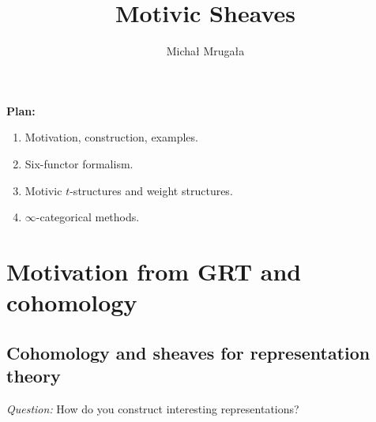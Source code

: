 

\usepackage{stmaryrd}
\usepackage[nameinlink]{cleveref}

\newcommand{\SC}{\mathcal{C}}
\newcommand{\OO}{\mathcal{O}}
\def\coker{\operatorname{coker}}
\def\bL{\mathbf{L}}
\def\CT{\mathcal{T}}
\def\Aut{\operatorname{Aut}}
\def\wt{\widetilde}
\def\ko{\mathfrak{o}}
\def\kt{\mathfrak{t}}
\newcommand{\CX}{\mathcal{X}}
\def\coker{\operatorname{coker}}
\def\bL{\mathbf{L}}
\def\wh{\widehat}
\def\CI{\mathcal{I}}
\def\et{^\text{\'et}}
\def\sep{^\text{sep}}
\def\pr{\operatorname{pr}}
\def\img{\operatorname{im}}
\def\Sym{\operatorname{Sym}}
\def\CG{\mathcal{G}}
\def\N{\mathbb{N}}
\def\th{^{\mathrm{th}}}
\def\CN{\mathcal{N}}
\def\Inf{\operatorname{Inf}}
\def\rank{\operatorname{rank}}
\def\Pic{\operatorname{Pic}}
\def\i{\operatorname{inv}}
\def\Diag{\operatorname{Diag}}
\def\G{\mathbb{G}}
\def\End{\operatorname{End}}
\def\det{\operatorname{det}}
\def\SL{\bb{SL}}
\def\Rep{\operatorname{Rep}}
\def\Repf{\operatorname{Rep}^{\text{fd}}}
\def\Res{\operatorname{Res}}
\def\Ind{\operatorname{Ind}}
\def\CL{\mathcal{L}}
\def\Zc{\underline{\mathbb{Z}}}
\def\DAet{\operatorname{DA}^{\text{\'et}}}
\def\SH{\operatorname{SH}}
\def\Sh{\operatorname{Sh}}
\def\PSh{\operatorname{PSh}}
\def\Cone{\operatorname{Cone}}
\def\A{\cat{A}}
\def\Ch{\operatorname{Ch}}
\def\EssIm{\operatorname{EssIm}}
\def\colim{\operatorname{colim}}
\def\ft{^{\text{(f.t)}}}
\def\an{^{\text{an}}}
\def\P{\mathbb{P}}

\title{Motivic Sheaves}
\author{Micha{\l} Mruga{\l}a}


\maketitle
\textbf{Plan:}
\begin{enumerate}[L1:]
	\item Motivation, construction, examples.
	\item Six-functor formalism.
	\item Motivic $t$-structures and weight structures.
	\item $\infty$-categorical methods.
\end{enumerate}
\section{Motivation from GRT and cohomology}
\subsection{Cohomology and sheaves for representation theory}
\emph{Question:} How do you construct interesting representations?

